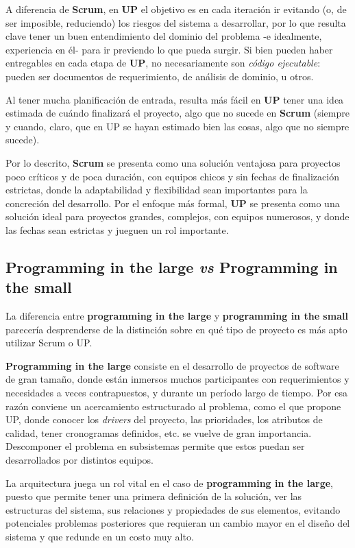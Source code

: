 A diferencia de \textbf{Scrum}, en \textbf{UP} el objetivo es en cada iteración ir evitando (o, de ser imposible, reduciendo) los riesgos del sistema a desarrollar, por lo que resulta clave tener un buen entendimiento del dominio del problema -e idealmente, experiencia en él- para ir previendo lo que pueda surgir. Si bien pueden haber entregables en cada etapa de \textbf{UP}, no necesariamente son \textit{código ejecutable}: pueden ser documentos de requerimiento, de análisis de dominio, u otros.

Al tener mucha planificación de entrada, resulta más fácil en \textbf{UP} tener una idea estimada de cuándo finalizará el proyecto, algo que no sucede en \textbf{Scrum} (siempre y cuando, claro, que en UP se hayan estimado bien las cosas, algo que no siempre sucede).

Por lo descrito, \textbf{Scrum} se presenta como una solución ventajosa para proyectos poco críticos y de poca duración, con equipos chicos y sin fechas de finalización estrictas, donde la adaptabilidad y flexibilidad sean importantes para la concreción del desarrollo. Por el enfoque más formal, \textbf{UP} se presenta como una solución ideal para proyectos grandes, complejos, con equipos numerosos, y donde las fechas sean estrictas y jueguen un rol importante.

\newpage
\subsection{Programming in the large \textit{vs} Programming in the small}
La diferencia entre \textbf{programming in the large} y \textbf{programming in the small} parecería desprenderse de la distinción sobre en qué tipo de proyecto es más apto utilizar Scrum o UP. 

\textbf{Programming in the large} consiste en el desarrollo de proyectos de software de gran tamaño, donde están inmersos muchos participantes con requerimientos y necesidades a veces contrapuestos, y durante un período largo de tiempo. Por esa razón conviene un acercamiento estructurado al problema, como el que propone UP, donde conocer los \emph{drivers} del proyecto, las prioridades, los atributos de calidad, tener cronogramas definidos, etc. se vuelve de gran importancia. Descomponer el problema en subsistemas permite que estos puedan ser desarrollados por distintos equipos. 

La arquitectura juega un rol vital en el caso de \textbf{programming in the large}, puesto que permite tener una primera definición de la solución, ver las estructuras del sistema, sus relaciones y propiedades de sus elementos, evitando potenciales problemas posteriores que requieran un cambio mayor en el diseño del sistema y que redunde en un costo muy alto.


